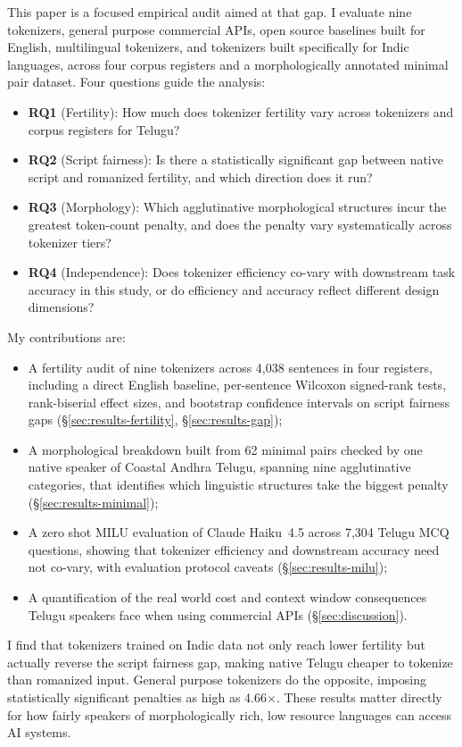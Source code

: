 ﻿\documentclass[11pt]{article}
\begin{document}
This paper is a focused empirical audit aimed at that gap. I
evaluate nine tokenizers, general purpose commercial APIs, open
source baselines built for English, multilingual tokenizers, and
tokenizers built specifically for Indic languages, across four corpus
registers and a morphologically annotated minimal pair dataset. Four
questions guide the analysis:
\begin{itemize}
    \item \textbf{RQ1} (Fertility): How much does tokenizer fertility
    vary across tokenizers and corpus registers for Telugu?
    \item \textbf{RQ2} (Script fairness): Is there a statistically
    significant gap between native script and romanized fertility,
    and which direction does it run?
    \item \textbf{RQ3} (Morphology): Which agglutinative morphological
    structures incur the greatest token-count penalty, and does the
    penalty vary systematically across tokenizer tiers?
    \item \textbf{RQ4} (Independence): Does tokenizer efficiency
    co-vary with downstream task accuracy in this study, or do
    efficiency and accuracy reflect different design dimensions?
\end{itemize}
My contributions are:
\begin{itemize}
    \item A fertility audit of nine tokenizers across 4,038 sentences
    in four registers, including a direct English baseline, per-sentence
    Wilcoxon signed-rank tests, rank-biserial effect sizes, and bootstrap
    confidence intervals on script fairness gaps (\S\ref{sec:results-fertility}, \S\ref{sec:results-gap});
    \item A morphological breakdown built from 62 minimal pairs
    checked by one native speaker of Coastal Andhra Telugu, spanning
    nine agglutinative
    categories, that identifies which linguistic structures take the
    biggest penalty (\S\ref{sec:results-minimal});
    \item A zero shot MILU evaluation of Claude Haiku~4.5 across
    7,304 Telugu MCQ questions, showing that tokenizer efficiency and
    downstream accuracy need not co-vary, with evaluation protocol
    caveats (\S\ref{sec:results-milu});
    \item A quantification of the real world cost and context
    window consequences Telugu speakers face when using commercial
    APIs (\S\ref{sec:discussion}).
\end{itemize}
I find that tokenizers trained on Indic data not only reach lower
fertility but actually reverse the script fairness gap, making
native Telugu cheaper to tokenize than romanized input. General
purpose tokenizers do the opposite, imposing statistically
significant penalties as high as 4.66$\times$. These results matter
directly for how fairly speakers of morphologically rich, low
resource languages can access AI systems.
\end{document}
